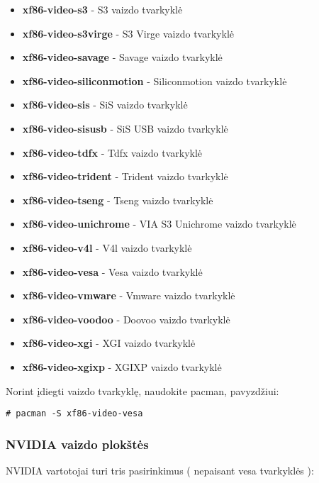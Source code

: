 \begin{itemize}
        \item \textbf{xf86-video-s3} - S3 vaizdo tvarkyklė
        \item \textbf{xf86-video-s3virge} - S3 Virge vaizdo tvarkyklė
        \item \textbf{xf86-video-savage} - Savage vaizdo tvarkyklė
        \item \textbf{xf86-video-siliconmotion} - Siliconmotion vaizdo tvarkyklė
        \item \textbf{xf86-video-sis} - SiS vaizdo tvarkyklė
        \item \textbf{xf86-video-sisusb} - SiS USB vaizdo tvarkyklė
        \item \textbf{xf86-video-tdfx} - Tdfx vaizdo tvarkyklė
        \item \textbf{xf86-video-trident} - Trident vaizdo tvarkyklė
        \item \textbf{xf86-video-tseng} - Tseng vaizdo tvarkyklė
        \item \textbf{xf86-video-unichrome} - VIA S3 Unichrome vaizdo tvarkyklė
        \item \textbf{xf86-video-v4l} - V4l vaizdo tvarkyklė
        \item \textbf{xf86-video-vesa} - Vesa vaizdo tvarkyklė
        \item \textbf{xf86-video-vmware} - Vmware vaizdo tvarkyklė
        \item \textbf{xf86-video-voodoo} - Doovoo vaizdo tvarkyklė
        \item \textbf{xf86-video-xgi} - XGI vaizdo tvarkyklė
        \item \textbf{xf86-video-xgixp} - XGIXP vaizdo tvarkyklė
      \end{itemize}

      Norint įdiegti vaizdo tvarkyklę, naudokite pacman, pavyzdžiui:

      \begin{verbatim}
# pacman -S xf86-video-vesa
      \end{verbatim}

      \subsubsection{NVIDIA vaizdo plokštės}

        NVIDIA vartotojai turi tris pasirinkimus ( nepaisant vesa
        tvarkyklės ):
        
